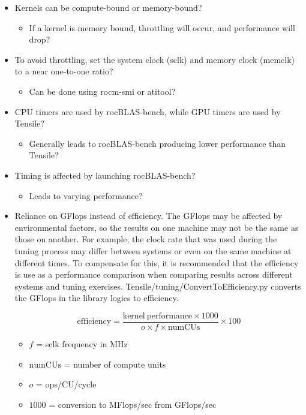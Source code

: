 \documentclass[]{article}
\begin{document}
\begin{itemize}

\item Kernels can be compute-bound or memory-bound?

 \begin{itemize}
 	\item If a kernel is memory bound, throttling will occur, and performance will drop?
 \end{itemize}

\item To avoid throttling, set the system clock (sclk) and memory clock (memclk) to a near one-to-one ratio?

  \begin{itemize}
  	\item Can be done using rocm-smi or atitool?
  \end{itemize}

\item CPU timers are used by rocBLAS-bench, while GPU timers are used by Tensile?

  \begin{itemize}
   	\item Generally leads to rocBLAS-bench producing lower performance than Tensile?
  \end{itemize}

\item Timing is affected by launching rocBLAS-bench?

  \begin{itemize}
  	\item Leads to varying performance?
  \end{itemize}

\item \label{sec:efficiency} Reliance on GFlops instead of efficiency. The GFlops may be affected by environmental factors, so the results on one machine may not be the same as those on another. For example, the clock rate that was used during the tuning process may differ between systems or even on the same machine at different times. To compensate for this, it is recommended that the efficiency is use as a performance comparison when comparing results across different systems and tuning exercises. Tensile/tuning/ConvertToEfficiency.py converts the GFlops in the library logics to efficiency.

$$ \mathrm{efficiency} = \frac{\mathrm{kernel\ performance} \times 1000}{o \times f \times \mathrm{numCUs}} \times 100 $$

\begin{itemize}
	\item $f$ = sclk frequency in MHz
	\item $\mathrm{numCUs}$ = number of compute units
	\item $o$ = ops/CU/cycle
	\item $1000$ = conversion to MFlops/sec from GFlops/sec
\end{itemize}

\end{itemize}
\end{document}
